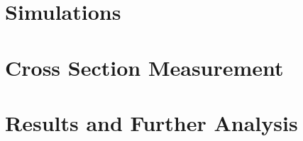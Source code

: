 \documentclass[12pt,twoside]{mitthesis}
\begin{document}
\chapter{Simulations} \label{Chapter:Simulations}
    

\chapter{Cross Section Measurement} \label{Chapter:BaseAnalysis}
    

\chapter{Results and Further Analysis} \label{Chapter:Further Analysis}
    


\


\printbibliography

\appendix
%


\end{document}
